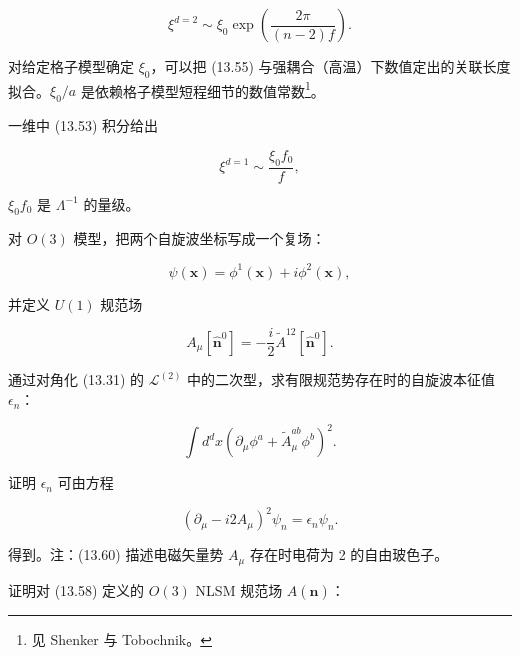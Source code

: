 \begin{equation*}
\xi^ {d = 2} \sim \xi_ {0} \exp \left( \frac {2 \pi}{( n - 2 ) f} \right).
\tag{13.55}
\end{equation*}

对给定格子模型确定 $\xi_{0}$，可以把 (13.55) 与强耦合（高温）下数值定出的关联长度拟合。$\xi_{0}/a$ 是依赖格子模型短程细节的数值常数\footnote{见 Shenker 与 Tobochnik。}。

一维中 (13.53) 积分给出

\begin{equation*}
\xi^ {d = 1} \sim \frac {\xi_ {0} f _ {0}}{f} ,
\tag{13.56}
\end{equation*}

$\xi_{0}f_{0}$ 是 $\Lambda^{-1}$ 的量级。

\begin{exercises}

\item 对 $O(3)$ 模型，把两个自旋波坐标写成一个复场：

\begin{equation*}
\psi ( \mathbf {x} ) = \phi^ {1} ( \mathbf {x} ) + i \phi^ {2} ( \mathbf {x} ) ,
\tag{13.57}
\end{equation*}

并定义 $U(1)$ 规范场

\begin{equation*}
A _ {\mu} [ \hat {\mathbf {n}} ^ {0} ] = - \frac {i}{2} \tilde {A} ^ {12} [ \hat {\mathbf {n}} ^ {0} ].
\tag{13.58}
\end{equation*}

通过对角化 (13.31) 的 $\mathcal{L}^{(2)}$ 中的二次型，求有限规范势存在时的自旋波本征值 $\epsilon_{n}$：

\begin{equation*}
\int d ^ {d} x \left( \partial_ {\mu} \phi^ {a} + \tilde {A} _ {\mu} ^ {ab} \phi^ {b} \right) ^ {2}.
\tag{13.59}
\end{equation*}

证明 $\epsilon_{n}$ 可由方程

\begin{equation*}
\left( \partial_ {\mu} - i 2 A _ {\mu} \right) ^ {2} \psi_ {n} = \epsilon_ {n} \psi_ {n}.
\tag{13.60}
\end{equation*}

得到。注：(13.60) 描述电磁矢量势 $A_{\mu}$ 存在时电荷为 2 的自由玻色子。

\item 证明对 (13.58) 定义的 $O(3)$ NLSM 规范场 $A(\hat{\mathbf{n}})$：


\end{exercises}
